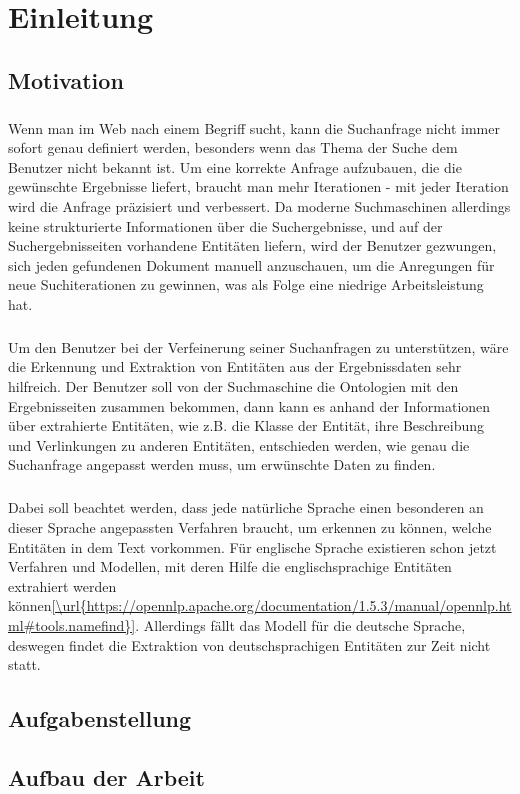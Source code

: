 \chapter{Einleitung}

\section{Motivation}
\label{sec:Motivation}
\paragraph{}
Wenn man im Web nach einem Begriff sucht, kann die Suchanfrage nicht immer sofort genau definiert werden, besonders wenn das Thema der Suche dem Benutzer nicht bekannt ist. Um eine korrekte Anfrage aufzubauen, die die gewünschte Ergebnisse liefert, braucht man mehr Iterationen - mit jeder Iteration wird die Anfrage präzisiert und verbessert. Da moderne Suchmaschinen allerdings keine strukturierte Informationen über die Suchergebnisse, und auf der Suchergebnisseiten vorhandene Entitäten liefern, wird der Benutzer gezwungen, sich jeden gefundenen Dokument manuell anzuschauen, um die Anregungen für neue Suchiterationen zu gewinnen, was als Folge eine niedrige Arbeitsleistung hat.

\paragraph{}
Um den Benutzer bei der Verfeinerung seiner Suchanfragen zu unterstützen, wäre die Erkennung und Extraktion von Entitäten aus der Ergebnissdaten sehr hilfreich. Der Benutzer soll von der Suchmaschine die Ontologien mit den Ergebnisseiten zusammen bekommen, dann kann es anhand der Informationen über extrahierte Entitäten, wie z.B. die Klasse der Entität, ihre Beschreibung und Verlinkungen zu anderen Entitäten, entschieden werden, wie genau die Suchanfrage angepasst werden muss, um erwünschte Daten zu finden.

\paragraph{}
Dabei soll beachtet werden, dass jede natürliche Sprache einen besonderen an dieser Sprache angepassten Verfahren braucht, um erkennen zu können, welche Entitäten in dem Text vorkommen. Für englische Sprache existieren schon jetzt Verfahren und Modellen, mit deren Hilfe die englischsprachige Entitäten extrahiert werden können\ref{\url{https://opennlp.apache.org/documentation/1.5.3/manual/opennlp.html#tools.namefind}}. Allerdings fällt das Modell für die deutsche Sprache, deswegen findet die Extraktion von deutschsprachigen Entitäten zur Zeit nicht statt.\

\paragraph{}

\section{Aufgabenstellung}
\label{sec:Aufgabenstellung}

\section{Aufbau der Arbeit}
\label{sec:Aufbau der Arbeit}